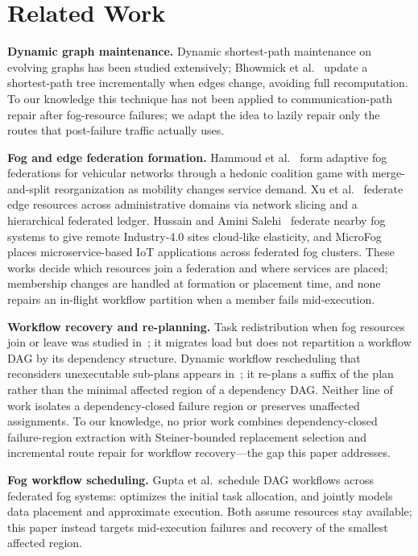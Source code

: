 \documentclass[conference]{IEEEtran}
\theoremstyle{remark}
\begin{document}
\section{Related Work}

\textbf{Dynamic graph maintenance.}
Dynamic shortest-path maintenance on evolving graphs has been studied
extensively; Bhowmick et al.~\cite{bhowmick2019} update a shortest-path tree
incrementally when edges change, avoiding full recomputation. To our
knowledge this technique has not been applied to communication-path repair
after fog-resource failures; we adapt the idea to lazily repair only the
routes that post-failure traffic actually uses.

\textbf{Fog and edge federation formation.}
Hammoud et al.~\cite{hammoud2022federation} form adaptive fog federations
for vehicular networks through a hedonic coalition game with
merge-and-split reorganization as mobility changes service demand.
Xu et al.~\cite{xu2022edgefed} federate edge resources across
administrative domains via network slicing and a hierarchical federated
ledger. Hussain and Amini Salehi~\cite{hussain2024serverless} federate
nearby fog systems to give remote Industry-4.0 sites cloud-like
elasticity, and MicroFog~\cite{microfog2023} places microservice-based IoT
applications across federated fog clusters. These works decide which
resources join a federation and where services are placed; membership
changes are handled at formation or placement time, and none repairs an
in-flight workflow partition when a member fails mid-execution.

\textbf{Workflow recovery and re-planning.}
Task redistribution when fog resources join or leave was studied
in~\cite{DynamicFog}; it migrates load but does not repartition a workflow
DAG by its dependency structure. Dynamic workflow rescheduling that
reconsiders unexecutable sub-plans appears in~\cite{DynamicWorkflow}; it
re-plans a suffix of the plan rather than the minimal affected region of a
dependency DAG. Neither line of work isolates a dependency-closed failure
region or preserves unaffected assignments. To our knowledge, no prior work
combines dependency-closed failure-region extraction with
Steiner-bounded replacement selection and incremental route repair for
workflow recovery---the gap this paper addresses.

\textbf{Fog workflow scheduling.}
Gupta et al.\ schedule DAG workflows across federated fog systems:
\cite{gupta2025efficient} optimizes the initial task allocation, and
\cite{gupta2025dataaware} jointly models data placement and approximate
execution. Both assume resources stay available; this paper instead targets
mid-execution failures and recovery of the smallest affected region.
\end{document}
